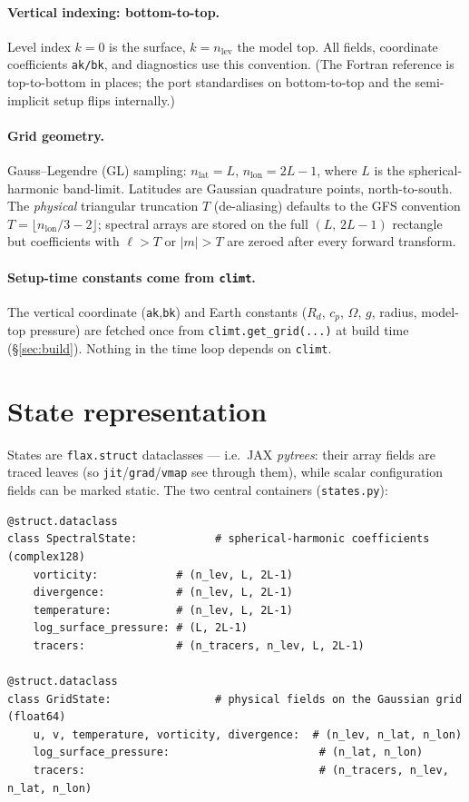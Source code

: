 \documentclass[11pt]{article}
\newcommand{\code}[1]{\texttt{#1}}
\begin{document}
\paragraph{Vertical indexing: bottom-to-top.} Level index $k=0$ is the surface,
$k=n_{\text{lev}}$ the model top. All fields, coordinate coefficients \code{ak/bk},
and diagnostics use this convention. (The Fortran reference is top-to-bottom in
places; the port standardises on bottom-to-top and the semi-implicit setup flips
internally.)

\paragraph{Grid geometry.} Gauss--Legendre (GL) sampling: $n_{\text{lat}}=L$,
$n_{\text{lon}}=2L-1$, where $L$ is the spherical-harmonic band-limit. Latitudes
are Gaussian quadrature points, north-to-south. The \emph{physical} triangular
truncation $T$ (de-aliasing) defaults to the GFS convention
$T=\lfloor n_{\text{lon}}/3-2\rfloor$; spectral arrays are stored on the full
$(L,\,2L-1)$ rectangle but coefficients with $\ell>T$ or $|m|>T$ are zeroed after
every forward transform.

\paragraph{Setup-time constants come from \code{climt}.} The vertical coordinate
(\code{ak},\code{bk}) and Earth constants ($R_d$, $c_p$, $\Omega$, $g$, radius,
model-top pressure) are fetched once from \code{climt.get\_grid(...)} at build time
(\S\ref{sec:build}). Nothing in the time loop depends on \code{climt}.

\section{State representation}\label{sec:states}

States are \code{flax.struct} dataclasses --- i.e.\ JAX \emph{pytrees}: their array
fields are traced leaves (so \code{jit}/\code{grad}/\code{vmap} see through them),
while scalar configuration fields can be marked static. The two central containers
(\code{states.py}):

\begin{lstlisting}
@struct.dataclass
class SpectralState:            # spherical-harmonic coefficients (complex128)
    vorticity:            # (n_lev, L, 2L-1)
    divergence:           # (n_lev, L, 2L-1)
    temperature:          # (n_lev, L, 2L-1)
    log_surface_pressure: # (L, 2L-1)
    tracers:              # (n_tracers, n_lev, L, 2L-1)

@struct.dataclass
class GridState:                # physical fields on the Gaussian grid (float64)
    u, v, temperature, vorticity, divergence:  # (n_lev, n_lat, n_lon)
    log_surface_pressure:                       # (n_lat, n_lon)
    tracers:                                    # (n_tracers, n_lev, n_lat, n_lon)
\end{lstlisting}
\end{document}
